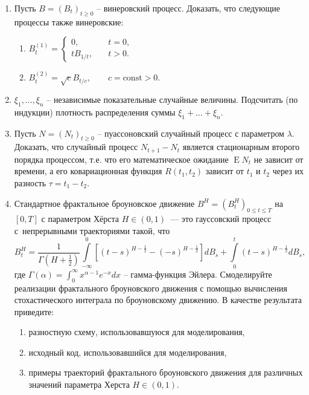 \documentclass[a4paper,14pt]{extreport}
\renewcommand{\=}[1]{\stackrel{#1}{=}} %
\newcommand{\Expect}{\mathop{{}\mathrm{E}}}
\newcommand{\generaltime}{t \geqslant 0}
\newcommand{\finiteconttime}[1]{0 \leqslant t \leqslant #1}
\newcommand{\newprocess}[1]{
	\ensuremath{
		#1 = \left(#1 _t\right)_{\generaltime}
	}
}
\newcommand{\newprocessfc}[2]{
	\ensuremath{
		#1 = \left(#1 _t\right)_{\finiteconttime{#2}}
	}
}
\newcommand{\fbm}{B^H}
\begin{document}
\begin{enumerate}
\item Пусть $\newprocess{B}$ -- винеровский процесс. Доказать,
что следующие процессы также винеровские:
\begin{enumerate}
	\item $B_t^{(1)} = 
	\begin{cases}
		0, \quad & t = 0, \\
		t B_{1/t}, \quad & t > 0.
	\end{cases}$
	\item $B_t^{(2)} = 
	\sqrt{c} B_{t/c}, \qquad c = \mathrm{const} > 0$.
\end{enumerate}

\item $\xi_1, \ldots, \xi_n$ -- независимые показательные случайные величины.
Подсчитать (по индукции) плотность распределения суммы
$\xi_1 + \ldots + \xi_n$.

\item Пусть $\newprocess{N}$ -- пуассоновский случайный
процесс с параметром $\lambda$. Доказать, что случайный
процесс $N_{t+1} - N_t$ является стационарным второго порядка
процессом, т.е. что его математическое ожидание $\Expect N_t$
не зависит от времени, а его ковариационная функция
$R(t_1, t_2)$ зависит от $t_1$ и $t_2$ через их разность
$\tau = t_1 - t_2$.

\item Стандартное фрактальное броуновское движение $\newprocessfc{\fbm}{T}$
на $[0,T]$ с параметром Хёрста $H \in (0,1)$~---
это гауссовский процесс с~непрерывными траекториями такой, что
\[
\fbm_t = \frac{1}{\Gamma(H + \frac 1 2)}
	\int\limits_{-\infty}^{0} [(t - s)^{H - \frac 1 2 } - (-s)^{H-\frac 1 2}] dB_s
	+ \int\limits_{0}^{t} (t - s)^{H - \frac 1 2 } dB_s,
\]
где 
$\Gamma(\alpha) = \int_0^{\infty} x^{\alpha - 1} e^{-x} dx$ -- гамма-функция Эйлера.
Смоделируйте реализации фрактального броуновского
движения с помощью вычисления стохастического интеграла
по броуновскому движению. В качестве результата
приведите:
\begin{enumerate}
	\item разностную схему, использовавшуюся для моделирования,
	\item исходный код, использовавшийся для моделирования,
	\item примеры траекторий фрактального броуновского движения
	для различных значений параметра Херста $H \in (0, 1)$.
\end{enumerate}


\end{enumerate}
\end{document}
